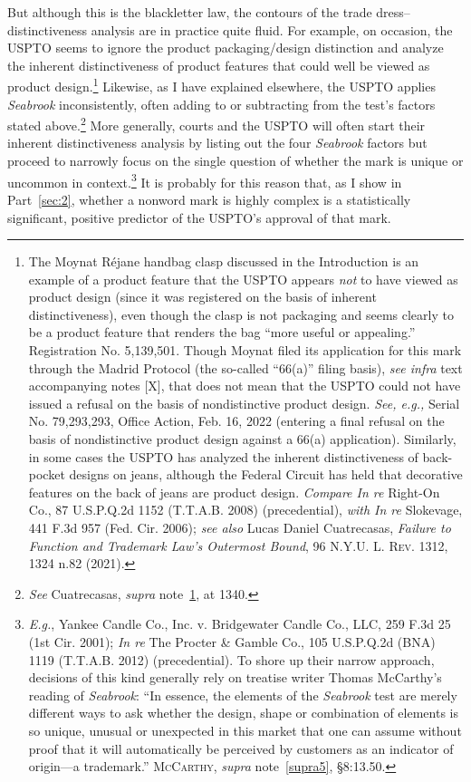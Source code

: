 \documentclass[letterpaper, 11pt, oneside]{article}
\begin{document}
But although this is the blackletter law, the contours of the trade dress–distinctiveness analysis are in practice quite fluid. For example, on occasion, the USPTO seems to ignore the product packaging/design distinction and analyze the inherent distinctiveness of product features that could well be viewed as product design.\footnote{\label{supra13} The Moynat Réjane handbag clasp discussed in the Introduction is an example of a product feature that the USPTO appears \emph{not} to have viewed as product design (since it was registered on the basis of inherent distinctiveness), even though the clasp is not packaging and seems clearly to be a product feature that renders the bag ``more useful or appealing.'' Registration No. 5,139,501. Though Moynat filed its application for this mark through the Madrid Protocol (the so-called ``66(a)'' filing basis), \textit{see infra} text accompanying notes [X], that does not mean that the USPTO could not have issued a refusal on the basis of nondistinctive product design. \textit{See, e.g.,} Serial No. 79,293,293, Office Action, Feb. 16, 2022 (entering a final refusal on the basis of nondistinctive product design against a 66(a) application). Similarly, in some cases the USPTO has analyzed the inherent distinctiveness of back-pocket designs on jeans, although the Federal Circuit has held that decorative features on the back of jeans are product design. \textit{Compare In re} Right-On Co., 87 U.S.P.Q.2d 1152 (T.T.A.B. 2008) (precedential), \textit{with In re} Slokevage, 441 F.3d 957 (Fed. Cir. 2006); \textit{see also} Lucas Daniel Cuatrecasas, \textit{Failure to Function and Trademark Law's Outermost Bound}, 96 \textsc{N.Y.U. L. Rev.} 1312, 1324 n.82 (2021).} Likewise, as I have explained elsewhere, the USPTO applies \textit{Seabrook} inconsistently, often adding to or subtracting from the test's factors stated above.\footnote{\textit{See} Cuatrecasas, \textit{supra} note~\ref{supra13}, at 1340.} More generally, courts and the USPTO will often start their inherent distinctiveness analysis by listing out the four \textit{Seabrook} factors but proceed to narrowly focus on the single question of whether the mark is unique or uncommon in context.\footnote{\textit{E.g.}, Yankee Candle Co., Inc. v. Bridgewater Candle Co., LLC, 259 F.3d 25 (1st Cir. 2001); \textit{In re} The Procter \& Gamble Co., 105 U.S.P.Q.2d (BNA) 1119 (T.T.A.B. 2012) (precedential). To shore up their narrow approach, decisions of this kind generally rely on treatise writer Thomas McCarthy's reading of \textit{Seabrook}: ``In essence, the elements of the \textit{Seabrook} test are merely different ways to ask whether the design, shape or combination of elements is so unique, unusual or unexpected in this market that one can assume without proof that it will automatically be perceived by customers as an indicator of origin—a trademark.'' \textsc{McCarthy}, \textit{supra} note~\ref{supra5}, \S 8:13.50.} It is probably for this reason that, as I show in Part~\ref{sec:2}, whether a nonword mark is highly complex is a statistically significant, positive predictor of the USPTO's approval of that mark.
\end{document}
